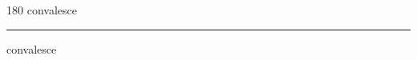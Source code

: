 
\begin{frame}
\begin{center}
\begin{turn}{180}
{\fontsize{2.5cm}{1em}\selectfont convalesce}
\end{turn}
\vspace{1em}\par  
\hrule
\vspace{1em}\par  
{\fontsize{2.5cm}{1em}\selectfont convalesce}
\end{center}
\end{frame}
